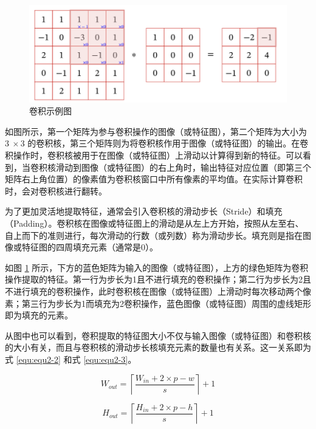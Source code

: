 \newpage

\begin{figure}[!htbp]
	\centering
	\includegraphics{figures/2.png}
	\caption{卷积示例图}
	\label{fig:fig2-1}
	\vspace{-0.8cm}  %
\end{figure}

如图所示，第一个矩阵为参与卷积操作的图像（或特征图），第二个矩阵为大小为 $3\ \times3$ 的卷积核，第三个矩阵则为将卷积核作用于图像（或特征图）的输出。在卷积操作时，卷积核被用于在图像（或特征图）上滑动以计算得到新的特征。可以看到，当卷积核滑动到图像（或特征图）的右上角时，输出特征对应位置（即第三个矩阵右上角位置）的像素值为卷积核窗口中所有像素的平均值。在实际计算卷积时，会对卷积核进行翻转。

为了更加灵活地提取特征，通常会引入卷积核的滑动步长（Stride）和填充（Padding）。卷积核在图像或特征图上的滑动是从左上方开始，按照从左至右、自上而下的准则进行，每次滑动的行数（或列数）称为滑动步长。填充则是指在图像或特征图的四周填充元素（通常是0）。

如图 \ref{fig:fig2-1} 所示，下方的蓝色矩阵为输入的图像（或特征图），上方的绿色矩阵为卷积操作提取的特征。第一行为步长为1且不进行填充的卷积操作；第二行为步长为2且不进行填充的卷积操作，此时卷积核在图像（或特征图）上滑动时每次移动两个像素；第三行为步长为1而填充为2卷积操作，蓝色图像（或特征图）周围的虚线矩形即为填充的元素。

从图中也可以看到，卷积提取的特征图大小不仅与输入图像（或特征图）和卷积核的大小有关，而且与卷积核的滑动步长核填充元素的数量也有关系。这一关系即为式 \ref{equ:equ2-2} 和式 \ref{equ:equ2-3}。

\begin{equation}
	W_{out}=\left\lceil\frac{W_{in}+2\times p-w}{s}\right\rceil+1
	\label{equ:equ2-2}
\end{equation}

\begin{equation}
	H_{out}=\left\lceil\frac{H_{in}+2\times p-h}{s}\right\rceil+1
	\label{equ:equ2-3}
\end{equation}


